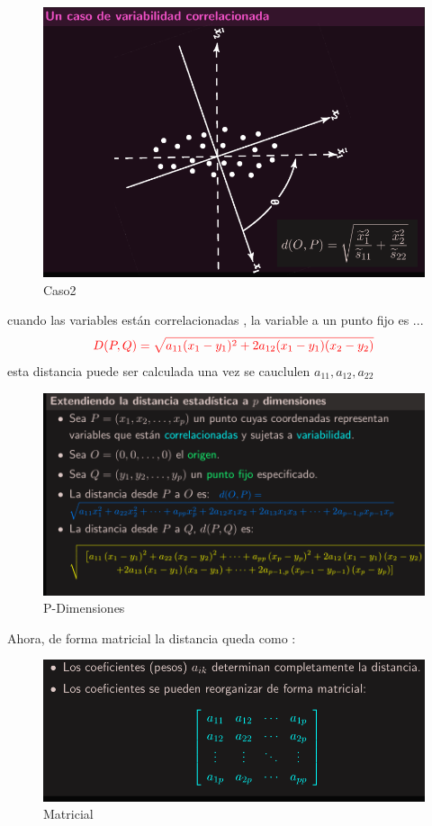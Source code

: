 \documentclass[10pt,a4paper]{article} %
\begin{document}
        \begin{figure}[h!]
            \centering
            \includegraphics[width=0.8\linewidth]{caso2.png}
            \caption{Caso2}
            \label{fig:caso2}
        \end{figure}

        cuando las variables están correlacionadas , la variable a un punto
        \color{red} fijo \color{white} es ...
        \begin{equation}
        \color{red}     D(P,Q) = \sqrt{ a_{11}(x_1 - y_1) ^{2}  +
            2a_{12}(x_1-y_1)(x_2-y_2)
            } \color{white}
        \end{equation}
        esta distancia puede ser calculada una vez se cauclulen $ a_{11}
        ,a_{12} , a_{22}  $

        \newpage
        \begin{figure}[h!]
            \centering
            \includegraphics[width=0.8\linewidth]{pdim.png}
            \caption{P-Dimensiones}
            \label{fig:pdim}
        \end{figure}
        Ahora, de forma matricial la distancia queda como :
        \begin{figure}[h!]
            \centering
            \includegraphics[width=0.5\linewidth]{matricial.png}
            \caption{Matricial}
            \label{fig:matricial}
        \end{figure}
\end{document}
